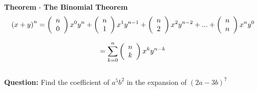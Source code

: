 \documentclass[11pt]{article}
\begin{document}
\textbf{Theorem} - \textbf{The Binomial Theorem}
$$\left({x+y}\right)^n = \left( {\begin{array}{*{20}c} n  \\ 0  \\ \end{array}} \right) x^0 y^n +  \left( {\begin{array}{*{20}c} n  \\ 1  \\ \end{array}} \right) x^1 y^{n-1} + \left( {\begin{array}{*{20}c} n  \\ 2 \\ \end{array}} \right) x^2 y^{n-2} + ... + \left( {\begin{array}{*{20}c} n  \\ n \\ \end{array}} \right) x^n y^0$$

$$= \sum\limits_{k = 0}^n {\left( {\begin{array}{*{20}c} n  \\ k  \\ \end{array}} \right) x^k y^{n-k}}$$
\\

\textbf{Question: } Find the coefficient of $a^5b^2$ in the expansion of $\left(2a-3b\right)^7$
\end{document}
